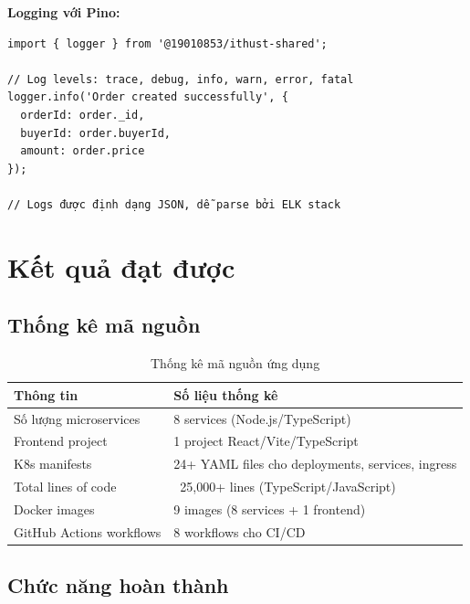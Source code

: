 \documentclass[12pt]{extreport}
\begin{document}
\textbf{Logging với Pino:}
\begin{lstlisting}[style=TypeScriptStyle, caption={Structured Logging}]
import { logger } from '@19010853/ithust-shared';

// Log levels: trace, debug, info, warn, error, fatal
logger.info('Order created successfully', {
  orderId: order._id,
  buyerId: order.buyerId,
  amount: order.price
});

// Logs được định dạng JSON, dễ parse bởi ELK stack
\end{lstlisting}

\section{Kết quả đạt được}

\subsection{Thống kê mã nguồn}

\begin{table}[H]
\centering
\begin{tabular}{|p{5cm}|p{9cm}|}
\hline
\textbf{Thông tin} & \textbf{Số liệu thống kê} \\ \hline
Số lượng microservices & 8 services (Node.js/TypeScript) \\ \hline
Frontend project & 1 project React/Vite/TypeScript \\ \hline
K8s manifests & 24+ YAML files cho deployments, services, ingress \\ \hline
Total lines of code & ~25,000+ lines (TypeScript/JavaScript) \\ \hline
Docker images & 9 images (8 services + 1 frontend) \\ \hline
GitHub Actions workflows & 8 workflows cho CI/CD \\ \hline
\end{tabular}
\caption{Thống kê mã nguồn ứng dụng}
\label{tab:thongke}
\end{table}

\subsection{Chức năng hoàn thành}
\end{document}
